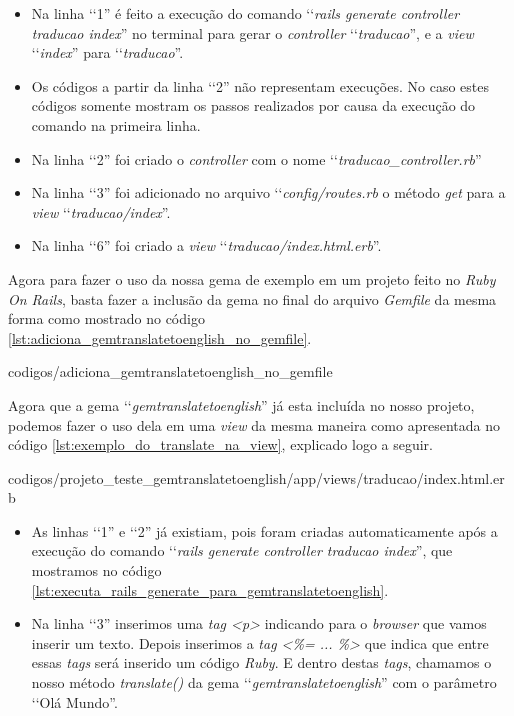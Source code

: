 \begin{itemize}

 \item Na linha ‘‘1'' é feito a execução do comando ‘‘\emph{rails generate controller traducao index}'' no
 terminal para gerar o \emph{controller} ‘‘\emph{traducao}'', e a \emph{view} ‘‘\emph{index}'' para
 ‘‘\emph{traducao}''.

 \item Os códigos a partir da linha ‘‘2'' não representam execuções. No caso estes códigos somente
 mostram os passos realizados por causa da execução do comando na primeira linha.

 \item Na linha ‘‘2'' foi criado o \emph{controller} com o nome ‘‘\emph{traducao\_controller.rb}''

 \item Na linha ‘‘3'' foi adicionado no arquivo ‘‘\emph{config/routes.rb} o método \emph{get} para a
 \emph{view} ‘‘\emph{traducao/index}''.

 \item Na linha ‘‘6'' foi criado a \emph{view} ‘‘\emph{traducao/index.html.erb}''.

\end{itemize}


Agora para fazer o uso da nossa gema de exemplo em um projeto feito no \emph{Ruby On Rails}, basta fazer a
inclusão da gema no final do arquivo \emph{Gemfile} da mesma forma como mostrado no código
\ref{lst:adiciona_gemtranslatetoenglish_no_gemfile}.

 
{codigos/adiciona_gemtranslatetoenglish_no_gemfile}

Agora que a gema ‘‘\emph{gemtranslatetoenglish}'' já esta incluída no nosso projeto, podemos fazer o uso
dela em uma \emph{view} da mesma maneira como apresentada no código \ref{lst:exemplo_do_translate_na_view},
explicado logo a seguir.


{codigos/projeto_teste_gemtranslatetoenglish/app/views/traducao/index.html.erb}

 \begin{itemize}

  \item As linhas ‘‘1'' e ‘‘2'' já existiam, pois foram criadas automaticamente após a execução do comando
  ‘‘\emph{rails generate controller traducao index}'', que mostramos no código
  \ref{lst:executa_rails_generate_para_gemtranslatetoenglish}.

  \item Na linha ‘‘3'' inserimos uma \emph{tag <p>} indicando para o \emph{browser} que vamos inserir um
  texto. Depois inserimos a \emph{tag <\%= ... \%>} que indica que entre essas \emph{tags} será inserido um
  código \emph{Ruby}. E dentro destas \emph{tags}, chamamos o nosso método \emph{translate()} da gema
  ‘‘\emph{gemtranslatetoenglish}'' com o parâmetro ‘‘Olá Mundo''.

 \end{itemize}

